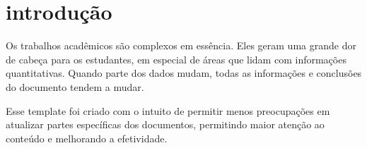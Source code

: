 \chapter{introdução}

Os trabalhos acadêmicos são complexos em essência. Eles geram uma grande dor de cabeça para os estudantes, em especial de áreas que lidam com informações quantitativas. Quando parte dos dados mudam, todas as informações e conclusões do documento tendem a mudar.

Esse template foi criado com o intuito de permitir menos preocupações em atualizar partes específicas dos documentos, permitindo maior atenção ao conteúdo e melhorando a efetividade.